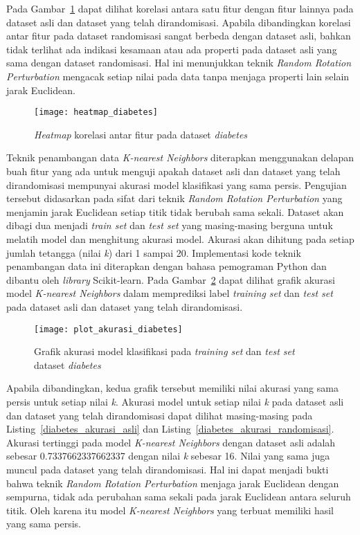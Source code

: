 Pada Gambar~\ref{fig:heatmap_diabetes} dapat dilihat korelasi antara satu fitur dengan fitur lainnya pada dataset asli dan dataset yang telah dirandomisasi. Apabila dibandingkan korelasi antar fitur pada dataset randomisasi sangat berbeda dengan dataset asli, bahkan tidak terlihat ada indikasi kesamaan atau ada properti pada dataset asli yang sama dengan dataset randomisasi. Hal ini menunjukkan teknik \textit{Random Rotation Perturbation} mengacak setiap nilai pada data tanpa menjaga properti lain selain jarak Euclidean.

\begin{figure}
	\centering
	\texttt{[image: heatmap\_diabetes]}
	\caption{\textit{Heatmap} korelasi antar fitur pada dataset \textit{diabetes}}
	\label{fig:heatmap_diabetes}
\end{figure}

Teknik penambangan data \textit{K-nearest Neighbors} diterapkan menggunakan delapan buah fitur yang ada untuk menguji apakah dataset asli dan dataset yang telah dirandomisasi mempunyai akurasi model klasifikasi yang sama persis. Pengujian tersebut didasarkan pada sifat dari teknik \textit{Random Rotation Perturbation} yang menjamin jarak Euclidean setiap titik tidak berubah sama sekali. Dataset akan dibagi dua menjadi \textit{train set} dan \textit{test set} yang masing-masing berguna untuk melatih model dan menghitung akurasi model. Akurasi akan dihitung pada setiap jumlah tetangga (nilai \textit{k}) dari 1 sampai 20. Implementasi kode teknik penambangan data ini diterapkan dengan bahasa pemograman Python dan dibantu oleh \textit{library} Scikit-learn. Pada Gambar~\ref{fig:plot_akurasi_diabetes} dapat dilihat grafik akurasi model \textit{K-nearest Neighbors} dalam memprediksi label \textit{training set} dan \textit{test set} pada dataset asli dan dataset yang telah dirandomisasi. 

\begin{figure}
	\centering
	\texttt{[image: plot\_akurasi\_diabetes]}
	\caption{Grafik akurasi model klasifikasi pada \textit{training set} dan \textit{test set} dataset \textit{diabetes}}
	\label{fig:plot_akurasi_diabetes}
\end{figure}

Apabila dibandingkan, kedua grafik tersebut memiliki nilai akurasi yang sama persis untuk setiap nilai \textit{k}. Akurasi model untuk setiap nilai \textit{k} pada dataset asli dan dataset yang telah dirandomisasi dapat dilihat masing-masing pada Listing~\ref{diabetes_akurasi_asli} dan Listing~\ref{diabetes_akurasi_randomisasi}. Akurasi tertinggi pada model \textit{K-nearest Neighbors} dengan dataset asli adalah sebesar 0.7337662337662337 dengan nilai \textit{k} sebesar 16. Nilai yang sama juga muncul pada dataset yang telah dirandomisasi. Hal ini dapat menjadi bukti bahwa teknik \textit{Random Rotation Perturbation} menjaga jarak Euclidean dengan sempurna, tidak ada perubahan sama sekali pada jarak Euclidean antara seluruh titik. Oleh karena itu model \textit{K-nearest Neighbors} yang terbuat memiliki hasil yang sama persis.

